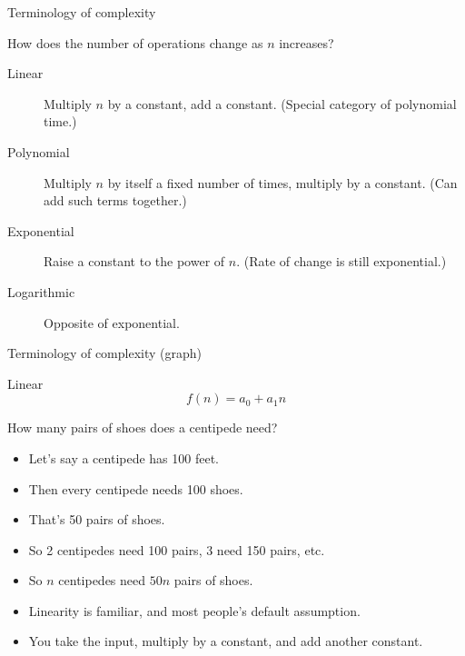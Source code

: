 \begin{frame}{Terminology of complexity}
  \begin{alertblock}{How does the number of operations change as $n$ increases?}
    \begin{description}
      \item[Linear] Multiply $n$ by a constant, add a constant. (Special category of polynomial time.)
      \item[Polynomial] Multiply $n$ by itself a fixed number of times, multiply by a constant. (Can add such terms together.)
      \item[Exponential] Raise a constant to the power of $n$. (Rate of change is still exponential.)
      \item[Logarithmic] Opposite of exponential.
    \end{description}
  \end{alertblock}
\end{frame}


\begin{frame}[fragile]{Terminology of complexity (graph)}
\begin{center}
\end{center}
\end{frame}



\begin{frame}{Linear}
  \[ f(n) = a_0 + a_1 n \]
  \begin{alertblock}{How many pairs of shoes does a centipede need?}
    \begin{itemize}
      \item Let's say a centipede has 100 feet.
      \item Then every centipede needs 100 shoes.
      \item That's 50 pairs of shoes.
      \item So 2 centipedes need 100 pairs, 3 need 150 pairs, etc.
      \item So $n$ centipedes need $50n$ pairs of shoes.
      \item Linearity is familiar, and most people's default assumption.
      \item You take the input, multiply by a constant, and add another constant.
    \end{itemize}
  \end{alertblock}
\end{frame}


